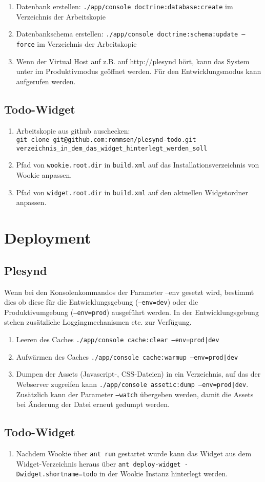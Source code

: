 \begin{enumerate}
 \item Datenbank erstellen: \texttt{./app/console doctrine:database:create} im Verzeichnis der Arbeitskopie
 \item Datenbankschema erstellen: \texttt{./app/console doctrine:schema:update --force} im Verzeichnis der Arbeitskopie
 \item Wenn der Virtual Host auf z.B. auf http://plesynd hört, kann das System unter  im Produktivmodus geöffnet werden. Für den Entwicklungsmodus kann  aufgerufen werden.   
\end{enumerate}

\subsection*{Todo-Widget}
\begin{enumerate}
 \item Arbeitskopie aus github auschecken: \\
 \texttt{git clone git@github.com:rommsen/plesynd-todo.git}\\ 
 \texttt{verzeichnis\_in\_dem\_das\_widget\_hinterlegt\_werden\_soll}
 \item Pfad von \texttt{wookie.root.dir} in \texttt{build.xml} auf das Installationsverzeichnis von Wookie anpassen.
 \item Pfad von \texttt{widget.root.dir} in \texttt{build.xml} auf den aktuellen Widgetordner anpassen.
\end{enumerate}

\section*{Deployment}

\subsection*{Plesynd}
Wenn bei den Konsolenkommandos der Parameter --env gesetzt wird, bestimmt dies ob diese für die Entwicklungsgebung (\texttt{--env=dev}) oder die Produktivumgebung (\texttt{--env=prod}) ausgeführt werden. In der Entwicklungsgebung stehen zusätzliche Loggingmechanismen etc. zur Verfügung.
\begin{enumerate}
 \item Leeren des Caches \texttt{./app/console cache:clear --env=prod|dev}
 \item Aufwärmen des Caches \texttt{./app/console cache:warmup --env=prod|dev}
 \item Dumpen der Assets (Javascript-, CSS-Dateien) in ein Verzeichnis, auf das der Webserver zugreifen kann \texttt{./app/console assetic:dump --env=prod|dev}. Zusätzlich kann der Parameter \texttt{--watch} übergeben werden, damit die Assets bei Änderung der Datei erneut gedumpt werden.
\end{enumerate}
\subsection*{Todo-Widget}
\begin{enumerate}
 \item Nachdem Wookie über \texttt{ant run} gestartet wurde kann das Widget aus dem Widget-Verzeichnis heraus über \texttt{ant deploy-widget -Dwidget.shortname=todo} in der Wookie Instanz hinterlegt werden.
\end{enumerate}